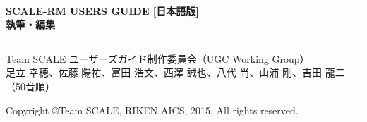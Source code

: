 \newpage
\thispagestyle{empty}

　\\

\vspace{10mm}
{\large{\bf SCALE-RM USERS GUIDE [日本語版]}}\\


\vspace{10mm}
{\large{\bf 執筆・編集}}\\
\hrule width 90mm
\begin{tabbing} 
Team SCALE ユーザーズガイド制作委員会（UGC Working Group）\\
足立 幸穂、佐藤 陽祐、富田 浩文、西澤 誠也、八代 尚、山浦 剛、吉田 龍二（50音順）\\
\end{tabbing} 


\vspace{110mm}
\begin{flushright}

\vspace{10mm}
Copyright \copyright Team SCALE, RIKEN AICS, 2015. All rights reserved.
\end{flushright}

